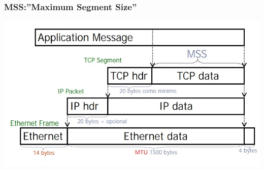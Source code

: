 \documentclass{beamer}
\begin{document}
\begin{frame}


	\frametitle{MSS:”Maximum Segment Size”}
\includegraphics[width=\textwidth]{MSS}
\end{frame}
\end{document}
